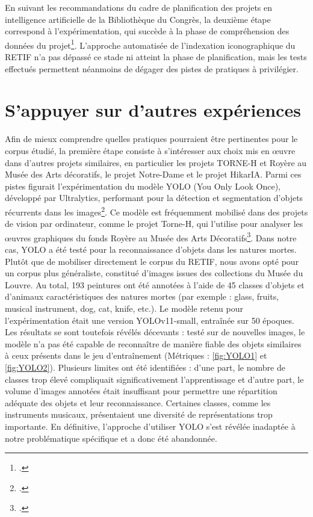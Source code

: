 En suivant les recommandations du cadre de planification des projets en intelligence artificielle de la Bibliothèque du Congrès, la deuxième étape correspond à l’expérimentation, qui succède à la phase de compréhension des données du projet\footcite{libraryofcongressPlanificationProjetIA2025}. L’approche automatisée de l’indexation iconographique du RETIF n’a pas dépassé ce stade ni atteint la phase de planification, mais les tests effectués permettent néanmoins de dégager des pistes de pratiques à privilégier.

\section{S’appuyer sur d’autres expériences}

Afin de mieux comprendre quelles pratiques pourraient être pertinentes pour le corpus étudié, la première étape consiste à s’intéresser aux choix mis en œuvre dans d’autres projets similaires, en particulier les projets TORNE-H et Royère au Musée des Arts décoratifs, le projet Notre-Dame et le projet HikarIA. 
Parmi ces pistes figurait l’expérimentation du modèle YOLO (You Only Look Once), développé par Ultralytics, performant pour la détection et segmentation d’objets récurrents dans les images\footcite{ultralyticsYOLOv8YOLOv112025}. Ce modèle est fréquemment mobilisé dans des projets de vision par ordinateur, comme le projet Torne-H, qui l’utilise pour analyser les œuvres graphiques du fonds Royère au Musée des Arts Décoratifs\footcite{bermesRepenserCollectionsPatrimoniales2025}. Dans notre cas, YOLO a été testé pour la reconnaissance d’objets dans les natures mortes. Plutôt que de mobiliser directement le corpus du RETIF, nous avons opté pour un corpus plus généraliste, constitué d’images issues des collections du Musée du Louvre. Au total, 193 peintures ont été annotées à l’aide de 45 classes d’objets et d’animaux caractéristiques des natures mortes (par exemple : glass, fruits, musical instrument, dog, cat, knife, etc.). Le modèle retenu pour l’expérimentation était une version YOLOv11-small, entraînée sur 50 époques. Les résultats se sont toutefois révélés décevants : testé sur de nouvelles images, le modèle n’a pas été capable de reconnaître de manière fiable des objets similaires à ceux présents dans le jeu d’entraînement (Métriques : \ref{fig:YOLO1} et \ref{fig:YOLO2}). Plusieurs limites ont été identifiées : d’une part, le nombre de classes trop élevé compliquait significativement l’apprentissage et d’autre part, le volume d’images annotées était insuffisant pour permettre une répartition adéquate des objets et leur reconnaissance. Certaines classes, comme les instruments musicaux, présentaient une diversité de représentations trop importante. En définitive, l’approche d’utiliser YOLO s’est révélée inadaptée à notre problématique spécifique et a donc été abandonnée.
